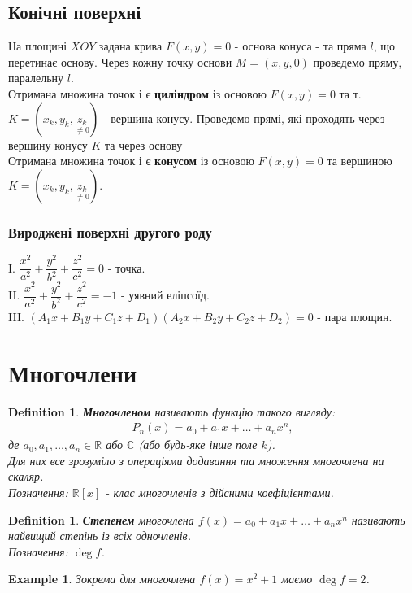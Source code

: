 \documentclass[a4paper, 10pt]{extarticle}
\theoremstyle{theoremdd}
\theoremstyle{theoremdd}
\newtheorem{definition}[theorem]{Definition}
\theoremstyle{theoremdd}
\theoremstyle{theoremdd}
\newtheorem{example}[theorem]{Example}
\theoremstyle{theoremdd}
\theoremstyle{theoremdd}
\theoremstyle{theoremdd}
\theoremstyle{theoremdd}
\begin{document}
\subsection{Конічні поверхні}
На площині $XOY$ задана крива $F(x,y) = 0$ - основа конуса - та пряма $l$, що перетинає основу. Через кожну точку основи $M = (x,y,0)$ проведемо пряму, паралельну $l$.\\
Отримана множина точок і є \textbf{циліндром} із основою $F(x,y) = 0$ та т. $K = (x_k, y_k, \underset{\neq 0}{z_k})$ - вершина конусу. Проведемо прямі, які проходять через вершину конусу $K$ та через основу\\
Отримана множина точок і є \textbf{конусом} із основою $F(x,y) = 0$ та вершиною $K = (x_k, y_k, \underset{\neq 0}{z_k})$.

\subsubsection*{Вироджені поверхні другого роду}
I. $\dfrac{x^2}{a^2} + \dfrac{y^2}{b^2} + \dfrac{z^2}{c^2} = 0$ - точка.\\
II. $\dfrac{x^2}{a^2} + \dfrac{y^2}{b^2} + \dfrac{z^2}{c^2} = -1$ - уявний еліпсоїд.\\
III. $(A_1 x + B_1 y + C_1 z + D_1)(A_2 x + B_2 y + C_2 z + D_2) = 0$ - пара площин.
\newpage

\section{Многочлени}
\begin{definition}
\textbf{Многочленом} називають функцію такого вигляду:
\begin{align*}
P_n(x) = a_0 + a_1 x + \dots + a_n x^n,
\end{align*}
де $a_0,a_1,\dots,a_n \in \mathbb{R}$ або $\mathbb{C}$ (або будь-яке інше поле $k$).\\
Для них все зрозуміло з операціями додавання та множення многочлена на скаляр.\\
Позначення: $\mathbb{R}[x]$ - клас многочленів з дійсними коефіцієнтами.
\end{definition}

\begin{definition}
\textbf{Степенем} многочлена $f(x) = a_0 + a_1 x + \dots + a_n x^n$ називають найвищий степінь із всіх одночленів.\\
Позначення: $\deg f$.
\end{definition}

\begin{example}
Зокрема для многочлена $f(x) = x^2 + 1$ маємо $\deg f = 2$.
\end{example}
\end{document}
